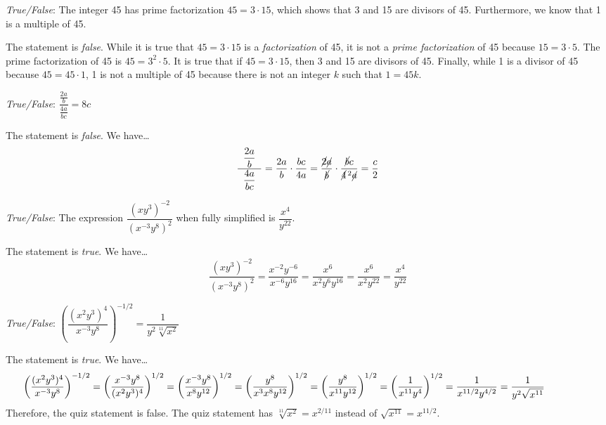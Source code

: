 \documentclass[11pt,letterpaper]{article}
\begin{document}
\thispagestyle{title}

\quizsol \textit{True/False}: The integer 45 has prime factorization $45= 3 \cdot 15$, which shows that 3 and 15 are divisors of 45. Furthermore, we know that 1 is a multiple of 45. \pspace

\sol The statement is \textit{false}. While it is true that $45= 3 \cdot 15$ is a \textit{factorization} of 45, it is not a \textit{prime factorization} of 45 because $15= 3 \cdot 5$. The prime factorization of 45 is $45= 3^2 \cdot 5$. It is true that if $45= 3 \cdot 15$, then 3 and 15 are divisors of 45. Finally, while 1 is a divisor of 45 because $45= 45 \cdot 1$, 1 is not a multiple of 45 because there is not an integer $k$ such that $1= 45k$. \pvspace{1.3cm}



\quizsol \textit{True/False}: $\dfrac{\frac{2a}{b}}{\frac{4a}{bc}}= 8c$ \pspace

\sol The statement is \textit{false}. We have\dots
	\[
	\dfrac{\;\;\dfrac{2a}{b}\;\;}{\dfrac{4a}{bc}}= \dfrac{2a}{b} \cdot \dfrac{bc}{4a}= \dfrac{\cancel{2} \cancel{a}}{\cancel{b}} \cdot \dfrac{\cancel{b}c}{\cancel{4}^{\,2} \cancel{a}}= \dfrac{c}{2}
	\] \pvspace{1.3cm}



\quizsol \textit{True/False}: The expression $\dfrac{(x y^3)^{-2}}{(x^{-3} y^8)^2}$ when fully simplified is $\dfrac{x^4}{y^{22}}$. \pspace

\sol The statement is \textit{true}. We have\dots
	\[
	\dfrac{(x y^3)^{-2}}{(x^{-3} y^8)^2}= \dfrac{x^{-2} y^{-6}}{x^{-6} y^{16}}= \dfrac{x^6}{x^2 y^6 y^{16}}= \dfrac{x^6}{x^2 y^{22}}= \dfrac{x^4}{y^{22}}
	\] \pvspace{1.3cm}



\quizsol \textit{True/False}: $\left( \dfrac{(x^2 y^3)^4}{x^{-3} y^8} \right)^{-1/2}= \dfrac{1}{y^2 \sqrt[11]{x^2}}$ \pspace

\sol The statement is \textit{true}. We have\dots
	\[
	\hspace{-1.7cm} \left( \dfrac{(x^2 y^3)^4}{x^{-3} y^8} \right)^{-1/2}= \left( \dfrac{x^{-3} y^8}{(x^2 y^3)^4} \right)^{1/2}= \left( \dfrac{x^{-3} y^8}{x^8 y^{12}} \right)^{1/2}= \left( \dfrac{y^8}{x^3 x^8 y^{12}} \right)^{1/2}= \left( \dfrac{y^8}{x^{11} y^{12}} \right)^{1/2}= \left( \dfrac{1}{x^{11} y^4} \right)^{1/2}= \dfrac{1}{x^{11/2} y^{4/2}}= \dfrac{1}{y^2 \sqrt{x^{11}}}
	\]
Therefore, the quiz statement is false. The quiz statement has $\sqrt[11]{x^2}= x^{2/11}$ instead of $\sqrt{x^{11}}= x^{11/2}$. 
\end{document}
